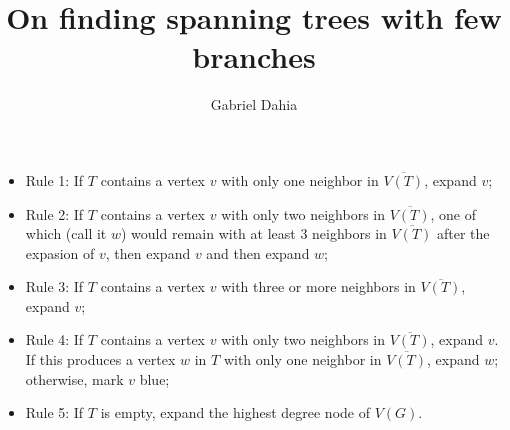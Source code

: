\documentclass[12pt]{article}
\title{On finding spanning trees with few branches}
\author{Gabriel Dahia\inst{1}}
\begin{document}
 

\maketitle

\begin{itemize}
  \item Rule 1: If $T$ contains a vertex $v$ with only one neighbor in $\overline{V(T)}$, expand $v$;
  \item Rule 2: If $T$ contains a vertex $v$ with only two neighbors in $\overline{V(T)}$, one of which (call it $w$) would remain with at least 3 neighbors in $\overline{V(T)}$ after the expasion of $v$, then expand $v$ and then expand $w$;
  \item Rule 3: If $T$ contains a vertex $v$ with three or more neighbors in $\overline{V(T)}$, expand $v$;
  \item Rule 4: If $T$ contains a vertex $v$ with only two neighbors in $\overline{V(T)}$, expand $v$.
    If this produces a vertex $w$ in $T$ with only one neighbor in $\overline{V(T)}$, expand $w$; otherwise, mark $v$ blue;
  \item Rule 5: If $T$ is empty, expand the highest degree node of $V(G)$.
\end{itemize}
\end{document}
